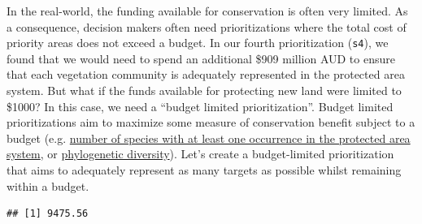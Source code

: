 \documentclass[12pt,]{book}
\newenvironment{Shaded}{\begin{snugshade}}{\end{snugshade}}
\newcommand{\KeywordTok}[1]{\textcolor[rgb]{0.13,0.29,0.53}{\textbf{#1}}}
\newcommand{\DataTypeTok}[1]{\textcolor[rgb]{0.13,0.29,0.53}{#1}}
\newcommand{\DecValTok}[1]{\textcolor[rgb]{0.00,0.00,0.81}{#1}}
\newcommand{\FloatTok}[1]{\textcolor[rgb]{0.00,0.00,0.81}{#1}}
\newcommand{\StringTok}[1]{\textcolor[rgb]{0.31,0.60,0.02}{#1}}
\newcommand{\CommentTok}[1]{\textcolor[rgb]{0.56,0.35,0.01}{\textit{#1}}}
\newcommand{\OtherTok}[1]{\textcolor[rgb]{0.56,0.35,0.01}{#1}}
\newcommand{\OperatorTok}[1]{\textcolor[rgb]{0.81,0.36,0.00}{\textbf{#1}}}
\newcommand{\NormalTok}[1]{#1}
\begin{document}
In the real-world, the funding available for conservation is often very
limited. As a consequence, decision makers often need prioritizations
where the total cost of priority areas does not exceed a budget. In our
fourth prioritization (\texttt{s4}), we found that we would need to
spend an additional \$909 million AUD to ensure that each vegetation
community is adequately represented in the protected area system. But
what if the funds available for protecting new land were limited to
\$1000? In this case, we need a ``budget limited prioritization''.
Budget limited prioritizations aim to maximize some measure of
conservation benefit subject to a budget (e.g.
\href{https://prioritizr.net/reference/add_max_cover_objective.html}{number
of species with at least one occurrence in the protected area system},
or
\href{https://prioritizr.net/reference/add_max_phylo_div_objective.html}{phylogenetic
diversity}). Let's create a budget-limited prioritization that aims to
adequately represent as many targets as possible whilst remaining within
a budget.

\begin{Shaded}
\end{Shaded}

\begin{verbatim}
## [1] 9475.56
\end{verbatim}

\begin{Shaded}
\end{Shaded}
\end{document}
